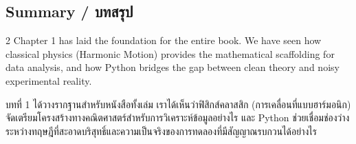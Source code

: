 \subsection{Summary \quad / \quad \textthai{บทสรุป}}
\begin{paracol}{2}
Chapter 1 has laid the foundation for the entire book. We have seen how classical physics (Harmonic Motion) provides the mathematical scaffolding for data analysis, and how Python bridges the gap between clean theory and noisy experimental reality.

\switchcolumn

\begin{thai}
บทที่ 1 ได้วางรากฐานสำหรับหนังสือทั้งเล่ม เราได้เห็นว่าฟิสิกส์คลาสสิก (การเคลื่อนที่แบบฮาร์มอนิก) จัดเตรียมโครงสร้างทางคณิตศาสตร์สำหรับการวิเคราะห์ข้อมูลอย่างไร และ Python ช่วยเชื่อมช่องว่างระหว่างทฤษฎีที่สะอาดบริสุทธิ์และความเป็นจริงของการทดลองที่มีสัญญาณรบกวนได้อย่างไร
\end{thai}
\end{paracol}
